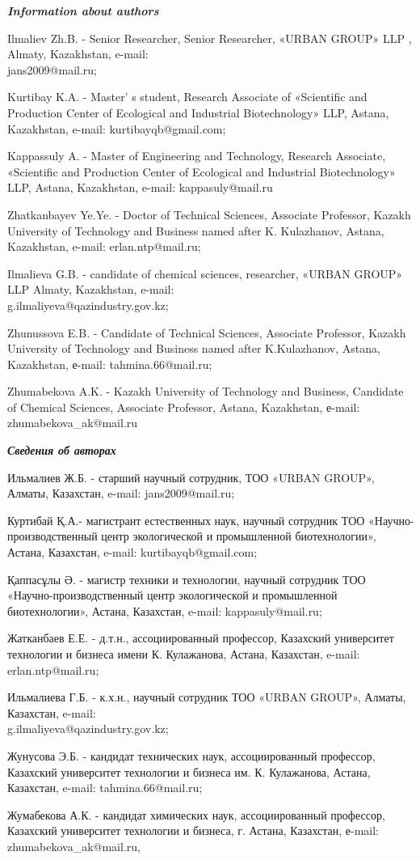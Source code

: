 \begin{authorinfo}
\emph{{\bfseries Information about authors}}

Ilmaliev Zh.B. - Senior Researcher, Senior Researcher, «URBAN GROUP» LLP
, Almaty, Kazakhstan, e-mail:\\ jans2009@mail.ru;

Kurtibay K.A. - Master' s student, Research Associate of
«Scientific and Production Center of Ecological and Industrial
Biotechnology» LLP, Astana, Kazakhstan, e-mail:
kurtibayqb@gmail.com;

Kappassuly A. - Master of Engineering and Technology, Research
Associate, «Scientific and Production Center of Ecological and
Industrial Biotechnology» LLP, Astana, Kazakhstan, e-mail:
kappasuly@mail.ru

Zhatkanbayev Ye.Ye. - Doctor of Technical Sciences, Associate Professor,
Kazakh University of Technology and Business named after K. Kulazhanov,
Astana, Kazakhstan, e-mail: erlan.ntp@mail.ru;

Ilmalieva G.B. - candidate of chemical sciences, researcher, «URBAN
GROUP» LLP Almaty, Kazakhstan, e-mail:\\ g.ilmaliyeva@qazindustry.gov.kz;

Zhunussova E.B. - Candidate of Technical Sciences, Associate Professor,
Kazakh University of Technology and Business named after K.Kulazhanov,
Astana, Kazakhstan, е-mail: tahmina.66@mail.ru;

Zhumabekova A.K. - Kazakh University of Technology and Business,
Candidate of Chemical Sciences, Associate Professor, Astana, Kazakhstan,
е-mail: zhumabekova\_ak@mail.ru

\emph{{\bfseries Сведения об авторах}}

Ильмалиев Ж.Б. - старший научный сотрудник, ТОО «URBAN GROUP», Алматы,
Казахстан, e-mail: jans2009@mail.ru;

Куртибай Қ.А.- магистрант естественных наук, научный сотрудник ТОО
«Научно-производственный центр экологической и промышленной
биотехнологии», Астана, Казахстан, e-mail: kurtibayqb@gmail.com;

Қаппасұлы Ә. - магистр техники и технологии, научный сотрудник ТОО
«Научно-производственный центр экологической и промышленной
биотехнологии», Астана, Казахстан, e-mail: kappasuly@mail.ru;

Жатканбаев Е.Е. - д.т.н., ассоциированный профессор, Казахский университет
технологии и бизнеса имени К. Кулажанова, Астана, Казахстан, e-mail:
erlan.ntp@mail.ru;

Ильмалиева Г.Б. - к.х.н., научный сотрудник ТОО «URBAN GROUP», Алматы,
Казахстан, e-mail: \\g.ilmaliyeva@qazindustry.gov.kz;

Жунусова Э.Б. - кандидат технических наук, ассоциированный профессор,
Казахский университет технологии и бизнеса им. К. Кулажанова, Астана,
Казахстан, e-mail: tahmina.66@mail.ru;

Жумабекова А.К. - кандидат химических наук, ассоциированный профессор,
Казахский университет технологии и бизнеса, г. Астана, Казахстан,
е-mail: zhumabekova\_ak@mail.ru,
\end{authorinfo}
